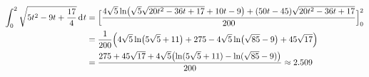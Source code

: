 \documentclass[../full]{subfiles}
\begin{document}
    \begin{align*}
        \int_0^2 \sqrt{5 t^2 - 9t + \frac{17}{4}} \dx[t] &
        = \FunctionBounds{
            \frac{
                4 \sqrt{5}
                \ln \paren[\big]{\sqrt{5} \sqrt{20 t^2 - 36t + 17} + 10t - 9}
                + \paren{50t - 45} \sqrt{20 t^2 - 36t + 17}
            }{200}
        }{0}{2}
        \\ &
        = \frac{1}{200} \paren[\Big]{
            4 \sqrt{5} \ln \paren[\big]{5 \sqrt{5} + 11} + 275
            - 4 \sqrt{5} \ln \paren[\big]{\sqrt{85} - 9} + 45 \sqrt{17}
        }
        \\ &
        = \frac{
            275 + 45 \sqrt{17} + 4 \sqrt{5} \paren[\big]{
                \ln \paren{5 \sqrt{5} + 11}
                - \ln \paren{\sqrt{85} - 9}
            }
        }{200}
        \approx 2.509
    \end{align*}
\end{document}
